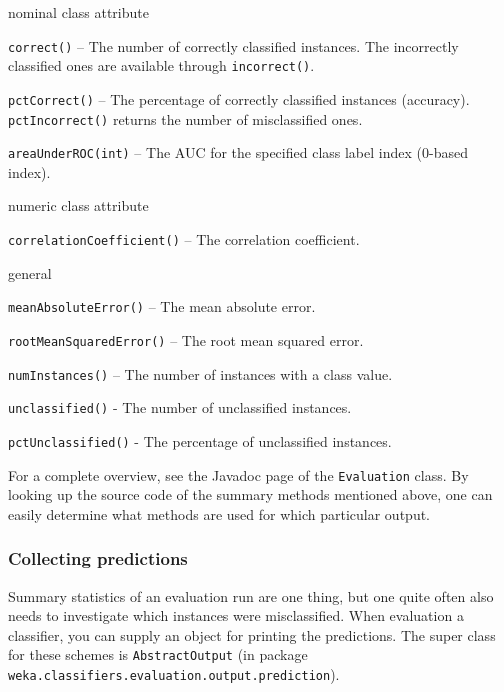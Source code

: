\begin{tight_itemize}
	\item nominal class attribute
	\begin{tight_itemize}
		\item \texttt{correct()} -- The number of correctly classified
instances. The incorrectly classified ones are available through
\texttt{incorrect()}.
		\item \texttt{pctCorrect()} -- The percentage of correctly classified
instances (accuracy). \texttt{pctIncorrect()} returns the number of
misclassified ones.
		\item \texttt{areaUnderROC(int)} -- The AUC for the specified class
label index (0-based index).
	\end{tight_itemize}

	\item numeric class attribute
	\begin{tight_itemize}
		\item \texttt{correlationCoefficient()} -- The correlation coefficient.
	\end{tight_itemize}

	\item general
	\begin{tight_itemize}
		\item \texttt{meanAbsoluteError()} -- The mean absolute error.
		\item \texttt{rootMeanSquaredError()} -- The root mean squared error.
		\item \texttt{numInstances()} -- The number of instances with a class
value.
		\item \texttt{unclassified()} - The number of unclassified instances.
		\item \texttt{pctUnclassified()} - The percentage of unclassified
instances.
	\end{tight_itemize}
\end{tight_itemize}
For a complete overview, see the Javadoc page of the \texttt{Evaluation} class.
By looking up the source code of the summary methods mentioned above, one can
easily determine what methods are used for which particular output.

\subsubsection*{Collecting predictions}
Summary statistics of an evaluation run are one thing, but one quite often
also needs to investigate which instances were misclassified.
When evaluation a classifier, you can supply an object for printing the
predictions. The super class for these schemes is \texttt{AbstractOutput}
(in package \texttt{weka.classifiers.evaluation.output.prediction}).

